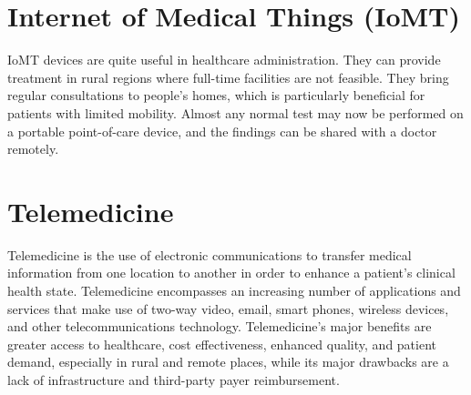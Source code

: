 \documentclass[12pt]{article}
\begin{document}
\section{ \LARGE Internet of Medical Things (IoMT) }
IoMT devices are quite useful in healthcare administration. They can provide treatment in rural regions where full-time facilities are not feasible. They bring regular consultations to people's homes, which is particularly beneficial for patients with limited mobility. Almost any normal test may now be performed on a portable point-of-care device, and the findings can be shared with a doctor remotely.



\section{ \LARGE Telemedicine}
Telemedicine is the use of electronic communications to transfer medical information from one location to another in order to enhance a patient's clinical health state. Telemedicine encompasses an increasing number of applications and services that make use of two-way video, email, smart phones, wireless devices, and other telecommunications technology. Telemedicine's major benefits are greater access to healthcare, cost effectiveness, enhanced quality, and patient demand, especially in rural and remote places, while its major drawbacks are a lack of infrastructure and third-party payer reimbursement.
\end{document}
